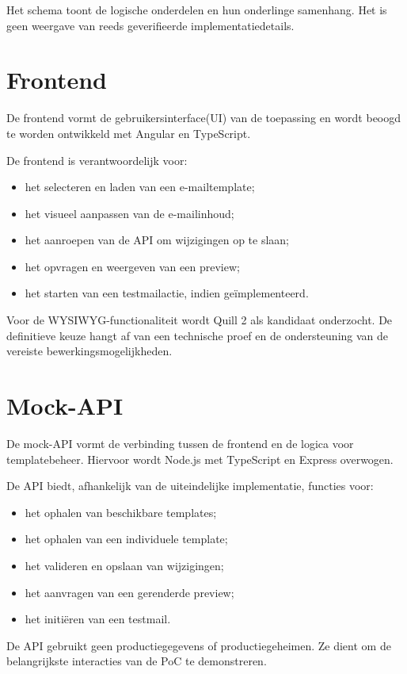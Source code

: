 \noindent
Het schema toont de logische onderdelen en hun onderlinge samenhang. Het is
geen weergave van reeds geverifieerde implementatiedetails.

\section{Frontend}
De frontend vormt de gebruikersinterface(UI) van de toepassing en wordt beoogd
te worden ontwikkeld met Angular en TypeScript.

De frontend is verantwoordelijk voor:
\begin{itemize}
    \item het selecteren en laden van een e-mailtemplate;
    \item het visueel aanpassen van de e-mailinhoud;
    \item het aanroepen van de API om wijzigingen op te slaan;
    \item het opvragen en weergeven van een preview;
    \item het starten van een testmailactie, indien geïmplementeerd.
\end{itemize}

Voor de WYSIWYG-functionaliteit wordt Quill 2 als kandidaat onderzocht.
De definitieve keuze hangt af van een technische proef en de ondersteuning
van de vereiste bewerkingsmogelijkheden.

\section{Mock-API}
De mock-API vormt de verbinding tussen de frontend en de logica voor
templatebeheer. Hiervoor wordt Node.js met TypeScript en Express overwogen.

De API biedt, afhankelijk van de uiteindelijke implementatie, functies voor:
\begin{itemize}
    \item het ophalen van beschikbare templates;
    \item het ophalen van een individuele template;
    \item het valideren en opslaan van wijzigingen;
    \item het aanvragen van een gerenderde preview;
    \item het initiëren van een testmail.
\end{itemize}

De API gebruikt geen productiegegevens of productiegeheimen. Ze dient om
de belangrijkste interacties van de PoC te demonstreren.

